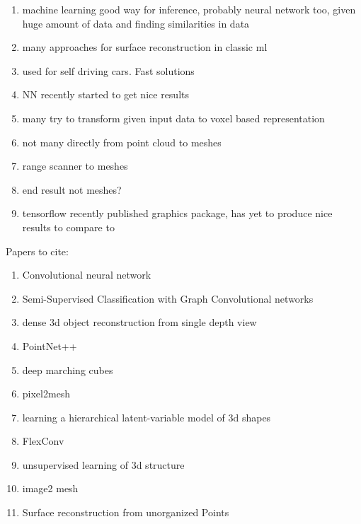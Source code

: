 \begin{enumerate}
  \item machine learning good way for inference, probably neural network too, given huge amount of data and finding similarities in data
  \item many approaches for surface reconstruction in classic ml
  \item used for self driving cars. Fast solutions
  \item NN recently started to get nice results
  \item many try to transform given input data to voxel based representation
  \item not many directly from point cloud to meshes
  \item range scanner to meshes
  \item end result not meshes?
  \item tensorflow recently published graphics package, has yet to produce nice results to compare to
\end{enumerate}
Papers to cite:
\begin{enumerate}
  \item Convolutional neural network
  \item Semi-Supervised Classification with Graph Convolutional networks
  \item dense 3d object reconstruction from single depth view
  \item PointNet++
  \item deep marching cubes
  \item pixel2mesh
  \item learning a hierarchical latent-variable model of 3d shapes
  \item FlexConv
  \item unsupervised learning of 3d structure
  \item image2 mesh
  \item Surface reconstruction from unorganized Points
\end{enumerate}
